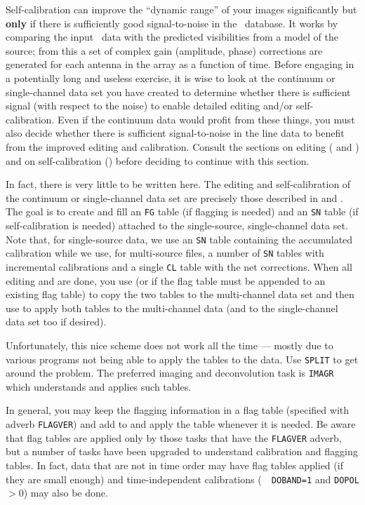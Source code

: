 
     Self-calibration can improve the ``dynamic range'' of your images
significantly but {\bf only} if there is sufficiently good
signal-to-noise in the \uv\ database.  It works by comparing the input
\uv\ data with the predicted visibilities from a model of the source;
from this a set of complex gain (amplitude, phase) corrections are
generated for each antenna in the array as a function of time.
Before engaging in a potentially long and useless exercise, it is
wise to look at the continuum or single-channel data set you have
created to determine whether there is sufficient signal (with respect
to the noise) to enable detailed editing and/or self-calibration.
Even if the continuum data would profit from these things, you must
also decide whether there is sufficient signal-to-noise in the line
data to benefit from the improved editing and calibration.  Consult
the sections on editing ( and ) and on
self-calibration () before deciding to continue with this
section.

     In fact, there is very little to be written here.  The editing
and self-calibration of the continuum or single-channel data set are
precisely those described in  and .  The goal
is to create and fill an {\tt FG} table (if flagging is needed) and an
{\tt SN} table (if self-calibration is needed) attached to the
single-source, single-channel data set.  Note that, for single-source
data, we use an {\tt SN} table containing the accumulated calibration
while we use, for multi-source files, a number of {\tt SN} tables with
incremental calibrations and a single {\tt CL} table with the net
corrections.  When all editing and  are done,
you use {\tt {}} (or {\tt {}} if the flag table
must be appended to an existing flag table) to copy the two tables to
the multi-channel data set and then use {\tt {}} to apply
both tables to the multi-channel data (and to the single-channel data
set too if desired).

     Unfortunately, this nice scheme does not work all the time ---
mostly due to various programs not being able to apply the tables to
the data.  Use {\tt SPLIT} to get around the problem.  The preferred
imaging and deconvolution task is {\tt IMAGR} which understands and
applies such tables.

    In general, you may keep the flagging information in a flag table
(specified with adverb {\tt FLAGVER}) and add to and apply the table
whenever it is needed.  Be aware that flag tables are applied only by
those tasks that have the {\tt FLAGVER} adverb, but a number of tasks
have been upgraded to understand calibration and flagging tables.  In
fact, data that are not in time order may have flag tables applied (if
they are small enough) and time-independent calibrations (\eg\ {\tt
DOBAND=1} and {\tt DOPOL} $> 0$) may also be done.

